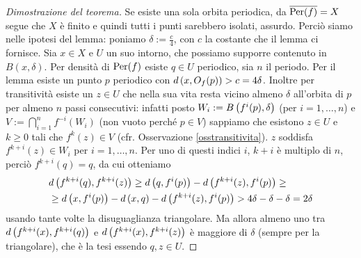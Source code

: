 \begin{proof}[Dimostrazione del teorema]Se esiste una sola orbita periodica,
da $\overline{\operatorname{Per}(f)}=X$ segue che $X$ è finito e quindi tutti i punti sarebbero isolati, assurdo.\newline
Perciò siamo nelle ipotesi del lemma: poniamo $\delta:=\frac{c}{4}$, con $c$ la costante che il lemma ci fornisce.
Sia $x\in X$ e $U$ un suo intorno, che possiamo supporre contenuto in $B(x,\delta)$. Per densità di $\operatorname{Per}(f)$ esiste $q\in U$ periodico,
sia $n$ il periodo. Per il lemma esiste un punto $p$ periodico con $d\left(x,O_f(p)\right)>c=4\delta$. Inoltre per transitività
esiste un $z\in U$ che nella sua vita resta vicino almeno $\delta$ all'orbita di $p$ per almeno $n$ passi consecutivi:
infatti posto $W_i:=B\left(f^i(p),\delta\right)$ (per $i=1,\dots,n$) e $V:=\bigcap_{i=1}^n f^{-i}(W_i)$ (non vuoto perché $p\in V$)
sappiamo che esistono $z\in U$ e $k\ge 0$ tali che $f^k(z)\in V$ (cfr. Osservazione \ref{osstransitivita}). $z$ soddisfa
$f^{k+i}(z)\in W_i$ per $i=1,\dots,n$. Per uno di questi indici $i$, $k+i$ è multiplo di $n$,
perciò $f^{k+i}(q)=q$, da cui otteniamo
\[ \begin{split} &d\left(f^{k+i}(q),f^{k+i}(z)\right)\ge d\left(q,f^i(p)\right)-d\left(f^{k+i}(z),f^i(p)\right)\ge \\
&\ge d\left(x,f^i(p)\right)-d\left(x,q\right)-d\left(f^{k+i}(z),f^i(p)\right)>4\delta-\delta-\delta=2\delta \end{split} \]
usando tante volte la disuguaglianza triangolare. Ma allora almeno uno tra
$d\left(f^{k+i}(x),f^{k+i}(q)\right)$ e $d\left(f^{k+i}(x),f^{k+i}(z)\right)$ è maggiore di $\delta$ (sempre per la triangolare), che è la tesi
essendo $q,z\in U$.
\end{proof}



